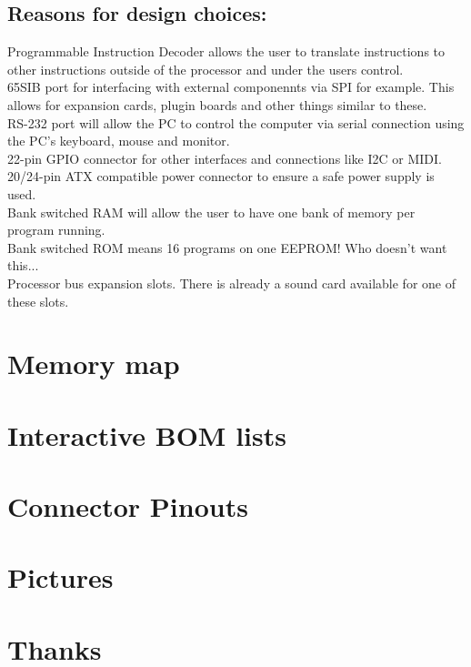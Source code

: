 \documentclass[11pt]{book} %
\begin{document}
\section{Reasons for design choices:}
Programmable Instruction Decoder allows the user to translate instructions to other instructions outside of the processor and under the users control.\\
65SIB port for interfacing with external componennts via SPI for example. This allows for expansion cards, plugin boards and other things similar to these.\\
RS-232 port will allow the PC to control the computer via serial connection using the PC's keyboard, mouse and monitor.\\
22-pin GPIO connector for other interfaces and connections like I2C or MIDI.\\
20/24-pin ATX compatible power connector to ensure a safe power supply is used.\\
Bank switched RAM will allow the user to have one bank of memory per program running.\\
Bank switched ROM means 16 programs on one EEPROM! Who doesn't want this...\\
Processor bus expansion slots. There is already a sound card available for one of these slots.\\
\chapter{Memory map}
\chapter{Interactive BOM lists}
\chapter{Connector Pinouts}
\chapter{Pictures}
\chapter{Thanks}
\end{document}

